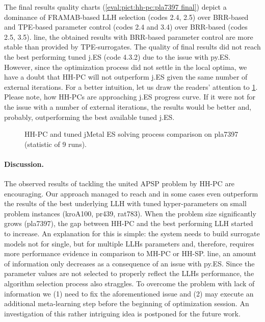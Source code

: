 The final results quality charts (\cref{eval:pict:hh-pc:pla7397 final}) depict a dominance of FRAMAB-based LLH selection (codes 2.4, 2.5) over BRR-based and TPE-based parameter control (codes 2.4 and 3.4) over BRR-based (codes 2.5, 3.5). line, the obtained results with BRR-based parameter control are more stable than provided by TPE-surrogates. The quality of final results did not reach the best performing tuned j.ES (code 4.3.2) due to the issue with py.ES. However, since the optimization process did not settle in the local optima, we have a doubt that HH-PC will not outperform j.ES given the same number of external iterations. For a better intuition, let us draw the readers' attention to \cref{eval:pict:hh-pc vs jES on pla7397 process}. Please note, how HH-PCs are approaching j.ES progress curve. If it were not for the issue with a number of external iterations, the results would be better and, probably, outperforming the best available tuned j.ES.

\begin{figure}[h]
	\centering
	\vspace{-5pt}
	
	\caption{HH-PC and tuned jMetal ES solving process comparison on pla7397 (statistic of 9 runs).}
	\vspace{-5pt}
	\label{eval:pict:hh-pc vs jES on pla7397 process}
\end{figure}

\paragraph{Discussion.} The observed results of tackling the united APSP problem by HH-PC are encouraging. Our approach managed to reach and in some cases even outperform the results of the best underlying LLH with tuned hyper-parameters on small problem instances (kroA100, pr439, rat783). When the problem size significantly grows (pla7397), the gap between HH-PC and the best performing LLH started to increase. An explanation for this is simple: the system needs to build surrogate models not for single, but for multiple LLHs parameters and, therefore, requires more performance evidence in comparison to MH-PC or HH-SP. line, an amount of information only decreases as a consequence of an issue with py.ES. Since the parameter values are not selected to properly reflect the LLHs performance, the algorithm selection process also straggles. To overcome the problem with lack of information we (1) need to fix the aforementioned issue and (2) may execute an additional meta-learning step before the beginning of optimization session. An investigation of this rather intriguing idea is postponed for the future work.


